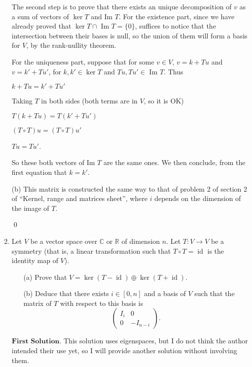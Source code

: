 \documentclass{article}
\theoremstyle{remark}
\begin{document}
\begin{enumerate}
        The second step is to prove that there exists an unique decomposition of $v$ as a sum of vectors of $\ker T$ and Im $T$.
        For the existence part, since we have already proved that $\ker T \cap$ Im $T = \{0\}$,
        suffices to notice that the intersection between their bases is null, so the union of them will form a basis for $V$, by the rank-nullity theorem.

        For the uniqueness part, suppose that for some $v \in V$, $v = k + Tu$ and $v = k' + Tu'$, for
        $k, k' \in \ker T$ and $Tu, Tu' \in $ Im $T$. Thus
        \begin{center}
            $k + Tu = k' + Tu'$
        \end{center}
        Taking $T$ in both sides (both terms are in $V$, so it is OK)
        \begin{center}
            $T(k + Tu) = T(k' + Tu')$
        \end{center}
        \begin{center}
            $(T\circ T)u = (T\circ T)u'$
        \end{center}
        \begin{center}
            $Tu = Tu'$.
        \end{center}
        So these both vectors of Im $T$ are the same ones. We then conclude, from the first equation that $k = k'$.

        (b) This matrix is constructed the same way to that of problem 2 of section 2 of ``Kernel, range and matrices sheet'', where $i$ depends on the dimension of the image of $T$.
        \begin{flushright}
            \qed
        \end{flushright}
        \item Let $V$ be a vector space over $\mathbb{C}$ or $\mathbb{R}$ of dimension $n$. Let $T \colon V \to V$ be a symmetry (that is, a linear transformation such that $T \circ T = \operatorname{id}$ is the identity map of $V$).

        \begin{enumerate}
            \item[(a)] Prove that $V = \ker(T - \operatorname{id}) \oplus \ker(T + \operatorname{id})$.
            \item[(b)] Deduce that there exists $i \in [0, n]$ and a basis of $V$ such that the matrix of $T$ with respect to this basis is
            \[
            \begin{pmatrix}
            I_i & 0 \\
            0 & -I_{n-i}
            \end{pmatrix}.
            \]
        \end{enumerate}
        $\textbf{First Solution.}$
        This solution uses eigenspaces, but I do not think the author intended their use yet, so I will provide another solution
        without involving them.


\end{enumerate}
\end{document}
